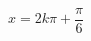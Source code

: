 \documentclass[border=0pt,12pt]{standalone}
\begin{document}
\fontsize{26}{31.2}\selectfont
$x=2k\pi+\dfrac{\pi}{6}$%
\end{document}
